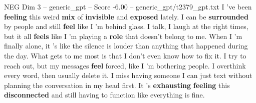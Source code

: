 \begin{textsample}{NEG Dim 3 – generic\_gpt – Score -6.00 – generic\_gpt/t2379\_gpt.txt}  \label{ex:f3_neg_004}
I ’ve been \textbf{feeling} this weird \textbf{mix} of \textbf{invisible} and \textbf{exposed} lately.
I can be \textbf{surrounded} by people and still \textbf{feel} like I ’m behind glass.
I talk, I laugh at the right times, but it all \textbf{feels} like I ’m playing a \textbf{role} that doesn't belong to me.
When I ’m finally alone, it ’s like the silence is louder than anything that happened during the day.
What gets to me most is that I don't even know how to fix it.
I try to reach out, but my messages \textbf{feel} forced, like I ’m bothering people.
I overthink every word, then usually delete it.
I miss having someone I can just text without planning the conversation in my head first.
It ’s \textbf{exhausting} \textbf{feeling} this \textbf{disconnected} and still having to function like everything is fine.

\end{textsample}
